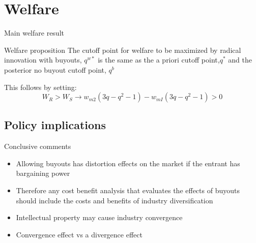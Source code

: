 \documentclass{beamer}
\numberwithin{equation}{section}
\begin{document}
\section{Welfare}

\begin{frame}{Main welfare result}
\begin{block}{Welfare proposition}
The cutoff point for welfare to be maximized by radical innovation with buyouts, $q^{w*}$ is the same as the a priori cutoff point,$q^{*}$ and the posterior no buyout cutoff point, $q^{b}$
\end{block}
This follows by setting: 
\begin{equation*}
W_R> W_S \rightarrow  w_{m2}(3q-q^2-1)-w_{mI}(3q-q^2-1)>0
\end{equation*}
\end{frame}


\subsection{Policy implications}




\begin{frame}{Conclusive comments }
\begin{itemize}
    \item Allowing buyouts has distortion effects on the market if the entrant has bargaining power
    \item Therefore any cost benefit analysis that evaluates the effects of buyouts should include the costs and benefits of industry diversification
    \item Intellectual property may cause industry convergence
    \item Convergence effect vs a divergence effect
\end{itemize}
\end{frame}

\begin{frame}

\small{
}
\end{frame}
\end{document}
